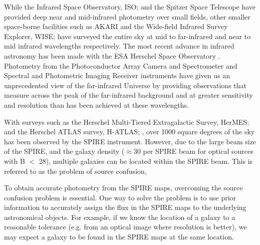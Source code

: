 \documentclass[useAMS,usenatbib]{mnras}
\begin{document}
While the Infrared Space Observatory, ISO; \cite{Kessler:1996} and the Spitzer Space Telescope \citep{Werner:2004} have provided deep near and mid-infrared photometry over small fields, other smaller space-borne facilities such as AKARI \citep{Murakami:2007} and the Wide-field Infrared Survey Explorer, WISE; \cite{Wright:2010} have surveyed the entire sky at mid to far-infrared and near to mid infrared wavelengths respectively. The most recent advance in infrared astronomy has been made with the ESA Herschel Space Observatory \citep{Pilbratt:2010}. Photometry from the Photoconductor Array Camera and Spectrometer \citep[PACS;][]{Poglitsch:2010} and Spectral and Photometric Imaging Receiver \citep[SPIRE;][]{Griffin:2010} instruments have given us an unprecedented view of the far-infrared Universe by providing observations that measure across the peak of the far-infrared background and at greater sensitivity and resolution than has been achieved at these wavelengths.

With surveys such as the Herschel Multi-Tiered Extragalactic Survey, HerMES; \cite{Oliver:2012} and the Herschel ATLAS survey, H-ATLAS; \cite{Eales:2010}, over 1000 square degrees of the sky has been observed by the SPIRE instrument. However, due to the large beam size of the SPIRE, and the galaxy density ($\approx 30$ per SPIRE beam for optical sources with B $<$ 28), multiple galaxies can be located within the SPIRE beam. This is referred to as the problem of source confusion, 

To obtain accurate photometry from the SPIRE maps, overcoming the source confusion problem is essential. One way to solve the problem is to use prior information to accurately assign the flux in the SPIRE maps to the underlying astronomical objects. For example, if we know the location of a galaxy to a reasonable tolerance (e.g. from an optical image where resolution is better), we may expect a galaxy to be found in the SPIRE maps at the same location.
\end{document}
